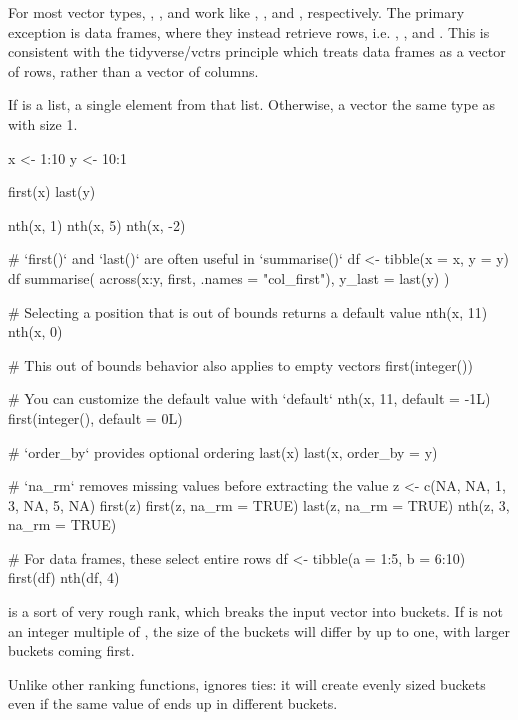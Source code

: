 \documentclass[a4paper]{book}
\begin{document}
%
\begin{Details}
For most vector types, , , and  work like
, \AsIs{\texttt{x[[length(x)]}}, and , respectively. The primary exception
is data frames, where they instead retrieve rows, i.e. , , and . This is consistent with the tidyverse/vctrs principle which
treats data frames as a vector of rows, rather than a vector of columns.
\end{Details}
%
\begin{Value}
If  is a list, a single element from that list. Otherwise, a vector the
same type as  with size 1.
\end{Value}
%
\begin{Examples}
\begin{ExampleCode}
x <- 1:10
y <- 10:1

first(x)
last(y)

nth(x, 1)
nth(x, 5)
nth(x, -2)

# `first()` and `last()` are often useful in `summarise()`
df <- tibble(x = x, y = y)
df %
  summarise(
    across(x:y, first, .names = "{col}_first"),
    y_last = last(y)
  )

# Selecting a position that is out of bounds returns a default value
nth(x, 11)
nth(x, 0)

# This out of bounds behavior also applies to empty vectors
first(integer())

# You can customize the default value with `default`
nth(x, 11, default = -1L)
first(integer(), default = 0L)

# `order_by` provides optional ordering
last(x)
last(x, order_by = y)

# `na_rm` removes missing values before extracting the value
z <- c(NA, NA, 1, 3, NA, 5, NA)
first(z)
first(z, na_rm = TRUE)
last(z, na_rm = TRUE)
nth(z, 3, na_rm = TRUE)

# For data frames, these select entire rows
df <- tibble(a = 1:5, b = 6:10)
first(df)
nth(df, 4)
\end{ExampleCode}
\end{Examples}
%
\begin{Description}
 is a sort of very rough rank, which breaks the input vector into
 buckets. If  is not an integer multiple of , the size of
the buckets will differ by up to one, with larger buckets coming first.

Unlike other ranking functions,  ignores ties: it will create
evenly sized buckets even if the same value of  ends up in different
buckets.
\end{Description}
\end{document}
